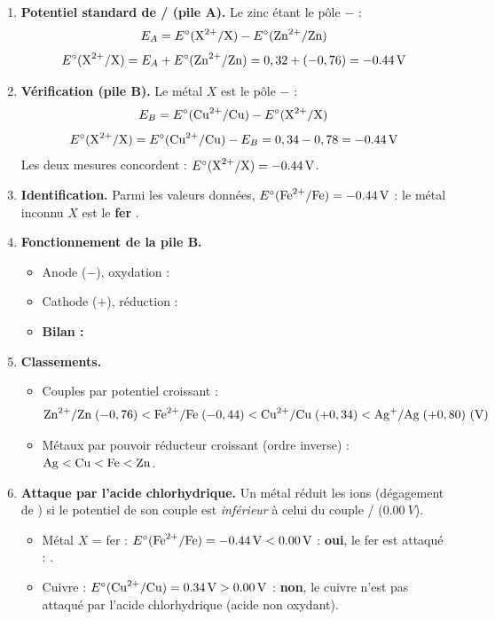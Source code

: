 \documentclass[11pt]{article}
\begin{document}
\begin{corrige}
\begin{enumerate}
\item \textbf{Potentiel standard de / (pile A).} Le zinc étant le pôle $-$ :
\[ E_A = E^{\circ}(\ce{X^2+}/\ce{X}) - E^{\circ}(\ce{Zn^2+}/\ce{Zn}) \]
\[ E^{\circ}(\ce{X^2+}/\ce{X}) = E_A + E^{\circ}(\ce{Zn^2+}/\ce{Zn}) = 0,32 + (-0,76) = \SI{-0,44}{V} \]
\item \textbf{Vérification (pile B).} Le métal $X$ est le pôle $-$ :
\[ E_B = E^{\circ}(\ce{Cu^2+}/\ce{Cu}) - E^{\circ}(\ce{X^2+}/\ce{X}) \]
\[ E^{\circ}(\ce{X^2+}/\ce{X}) = E^{\circ}(\ce{Cu^2+}/\ce{Cu}) - E_B = 0,34 - 0,78 = \SI{-0,44}{V} \]
Les deux mesures concordent : $E^{\circ}(\ce{X^2+}/\ce{X}) = \SI{-0,44}{V}$.
\item \textbf{Identification.} Parmi les valeurs données, $E^{\circ}(\ce{Fe^2+}/\ce{Fe}) = \SI{-0,44}{V}$ : le métal inconnu $X$ est le \textbf{fer} .
\item \textbf{Fonctionnement de la pile B.}
\begin{itemize}
\item Anode ($-$), oxydation : 
\item Cathode ($+$), réduction : 
\item \textbf{Bilan :} 
\end{itemize}
\item \textbf{Classements.}
\begin{itemize}
\item Couples par potentiel croissant :
\[ \ce{Zn^2+}/\ce{Zn}\;(-0,76) < \ce{Fe^2+}/\ce{Fe}\;(-0,44) < \ce{Cu^2+}/\ce{Cu}\;(+0,34) < \ce{Ag+}/\ce{Ag}\;(+0,80)\ \text{(V)} \]
\item Métaux par pouvoir réducteur croissant (ordre inverse) : $\ce{Ag} < \ce{Cu} < \ce{Fe} < \ce{Zn}$.
\end{itemize}
\item \textbf{Attaque par l'acide chlorhydrique.} Un métal réduit les ions  (dégagement de ) si le potentiel de son couple est \emph{inférieur} à celui du couple / ($\SI{0,00}{V}$).
\begin{itemize}
\item Métal $X$ = fer : $E^{\circ}(\ce{Fe^2+}/\ce{Fe}) = \SI{-0,44}{V} < \SI{0,00}{V}$ : \textbf{oui}, le fer est attaqué : .
\item Cuivre : $E^{\circ}(\ce{Cu^2+}/\ce{Cu}) = \SI{+0,34}{V} > \SI{0,00}{V}$ : \textbf{non}, le cuivre n'est pas attaqué par l'acide chlorhydrique (acide non oxydant).

\end{itemize}
\end{enumerate}
\end{corrige}
\end{document}
